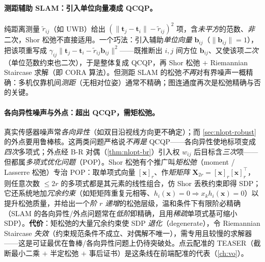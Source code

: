 \paragraph{测距辅助 SLAM：引入单位向量凑成 QCQP。}\cite{carlone2026handbook}
纯距离测量 $\tilde{r}_{ij}$（如 UWB）给出 $(\|\mathbf{t}_j-\mathbf{t}_i\|-\tilde{r}_{ij})^2$ 项，含\emph{未平方}的范数、\emph{非}二次，Shor 松弛不直接适用。一个巧法：引入辅助\emph{单位向量} $\mathbf{b}_{ij}$（$\|\mathbf{b}_{ij}\|=1$），把该项重写成 $\gamma_{ij}\|\mathbf{t}_j-\mathbf{t}_i-\tilde{r}_{ij}\mathbf{b}_{ij}\|^2$——既推断出 $i,j$ 间方位 $\mathbf{b}_{ij}$、又使该项\emph{二次}（单位范数约束也二次），于是整体复成 QCQP，再 Shor 松弛 $+$ Riemannian Staircase 求解（即 CORA 算法）。但测距 SLAM 的松弛\emph{不再}对有界噪声一概精确：多机仅靠机间\emph{测距}（无相对位姿）通常不精确；图连通度再次是松弛精确与否的关键。

\paragraph{各向异性噪声与外点：超出 QCQP，需矩松弛。}\cite{carlone2026handbook,yang2021teaser}
真实传感器噪声常\emph{各向异性}（如双目沿视线方向更不确定）；而 \cref{sec:nlopt-robust} 的外点要用鲁棒核。这两类问题严格说\emph{不再是} QCQP——各向异性使地标项变成\emph{四次}多项式；外点经 B-R 对偶（\cref{thm:nlopt-br}）引入权 $w_{ij}$ 后目标含\emph{三次}项——但都属\emph{多项式优化问题}（POP）。Shor 松弛有个推广叫\emph{矩松弛}（moment / Lasserre 松弛）专治 POP：取单项式向量 $[\mathbf{x}]_r$、作\emph{矩矩阵} $\mathbf{X}_{2r}=[\mathbf{x}]_r[\mathbf{x}]_r^\top$，则任意次数 $\le2r$ 的多项式都是其元素的线性组合，仿 Shor 丢秩约束即得 SDP；它还系统地加\emph{冗余约束}（如矩矩阵重复元相等、$h_i(\mathbf{x})=0\Rightarrow x_k h_i(\mathbf{x})=0$）以提升松弛质量，并给出一个\emph{阶 $r$ 递增}的松弛层级，温和条件下有限阶必精确（SLAM 的各向异性/外点问题常在\emph{低阶}即精确，且用\emph{稀疏}单项式基可缩小 SDP）。\textbf{代价}：矩松弛的大量冗余约束使 SDP \emph{退化}（degenerate），令 Riemannian Staircase \emph{失效}（约束规范条件不成立、对偶解不唯一），需专用且较慢的求解器——这是可证最优在鲁棒/各向异性问题上仍待突破处。点云配准的 TEASER\cite{yang2021teaser}（截断最小二乘 $+$ 半定松弛 $+$ 事后证书）是这条线在前端配准的代表（\cref{ch:vo}）。

